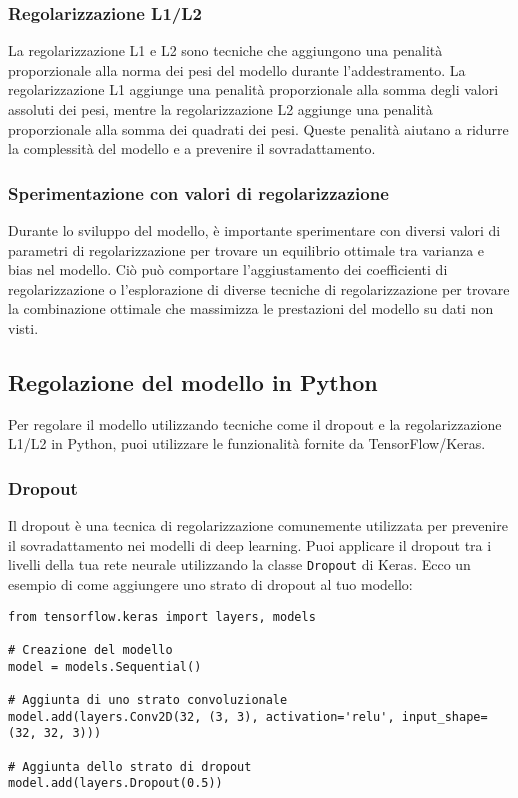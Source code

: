 \documentclass{article}
\begin{document}
\subsubsection{Regolarizzazione L1/L2}

La regolarizzazione L1 e L2 sono tecniche che aggiungono una penalità proporzionale alla norma dei pesi del modello durante l'addestramento. La regolarizzazione L1 aggiunge una penalità proporzionale alla somma degli valori assoluti dei pesi, mentre la regolarizzazione L2 aggiunge una penalità proporzionale alla somma dei quadrati dei pesi. Queste penalità aiutano a ridurre la complessità del modello e a prevenire il sovradattamento.

\subsubsection{Sperimentazione con valori di regolarizzazione}

Durante lo sviluppo del modello, è importante sperimentare con diversi valori di parametri di regolarizzazione per trovare un equilibrio ottimale tra varianza e bias nel modello. Ciò può comportare l'aggiustamento dei coefficienti di regolarizzazione o l'esplorazione di diverse tecniche di regolarizzazione per trovare la combinazione ottimale che massimizza le prestazioni del modello su dati non visti.

\subsection{Regolazione del modello in Python}

Per regolare il modello utilizzando tecniche come il dropout e la regolarizzazione L1/L2 in Python, puoi utilizzare le funzionalità fornite da TensorFlow/Keras.

\subsubsection{Dropout}

Il dropout è una tecnica di regolarizzazione comunemente utilizzata per prevenire il sovradattamento nei modelli di deep learning. Puoi applicare il dropout tra i livelli della tua rete neurale utilizzando la classe \texttt{Dropout} di Keras. Ecco un esempio di come aggiungere uno strato di dropout al tuo modello:

\begin{verbatim}
from tensorflow.keras import layers, models

# Creazione del modello
model = models.Sequential()

# Aggiunta di uno strato convoluzionale
model.add(layers.Conv2D(32, (3, 3), activation='relu', input_shape=(32, 32, 3)))

# Aggiunta dello strato di dropout
model.add(layers.Dropout(0.5))

\end{verbatim}
\end{document}
